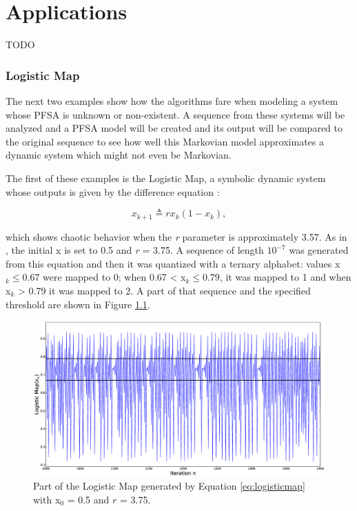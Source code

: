 \chapter{Applications}\label{cap:5}


{\lettrine[loversize=0.25,findent=0.2em,nindent=0em]{T}{ODO} 

\subsection{Logistic Map}

The next two examples show how the algorithms fare when modeling a system whose PFSA is unknown or non-existent. A sequence from these systems will be analyzed and a PFSA model will be created and its output will be compared to the original sequence to see how well this Markovian model approximates a dynamic system which might not even be Markovian.

The first of these examples is the Logistic Map, a symbolic dynamic system whose outputs is given by the difference equation \cite{asok.14}:

\begin{equation}
x_{k+1} \triangleq rx_k(1-x_k), \label{eq:logisticmap}
\end{equation}


\noindent which shows chaotic behavior when the \textit{r} parameter is approximately 3.57. As in \cite{asok.14}, the initial x is set to 0.5 and \textit{r} = 3.75. A sequence of length $10^{-7}$ was generated from this equation and then it was quantized with a ternary alphabet: values x$_k \leq 0.67$ were mapped to 0; when 0.67 < x$_k \leq 0.79$, it was mapped to 1 and when x$_k$ > 0.79 it was mapped to 2. A part of that sequence and the specified threshold are shown in Figure \ref{fig:lmapseq}.

\begin{figure}
\includegraphics[scale=0.25]{Figuras/logisticmap.eps}
\caption{Part of the Logistic Map generated by Equation \ref{eq:logisticmap} with x$_0$ = 0.5 and $r$ = 3.75.\label{fig:lmapseq}}
\end{figure}

}
